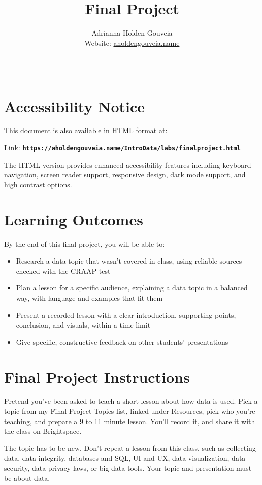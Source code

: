 \documentclass[12pt]{article}
\title{Final Project}
\author{
        Adrianna Holden-Gouveia \\
        Website: \href{https://aholdengouveia.name}{aholdengouveia.name}\\ 
        \date{\vspace{-5ex}}
        \faGithub {: aholdengouveia} \\
        }
\begin{document}
\maketitle

\section*{Accessibility Notice}
This document is also available in HTML format at:

Link: \href{https://aholdengouveia.name/IntroData/labs/finalproject.html}{\textbf{\nolinkurl{https://aholdengouveia.name/IntroData/labs/finalproject.html}}}

The HTML version provides enhanced accessibility features including keyboard navigation, screen reader support, responsive design, dark mode support, and high contrast options.

\section*{Learning Outcomes}
By the end of this final project, you will be able to:
\begin{itemize}
    \item Research a data topic that wasn't covered in class, using reliable sources checked with the CRAAP test
    \item Plan a lesson for a specific audience, explaining a data topic in a balanced way, with language and examples that fit them
    \item Present a recorded lesson with a clear introduction, supporting points, conclusion, and visuals, within a time limit
    \item Give specific, constructive feedback on other students' presentations
\end{itemize}

\section*{Final Project Instructions}
Pretend you've been asked to teach a short lesson about how data is used. Pick a topic from my Final Project Topics list, linked under Resources, pick who you're teaching, and prepare a 9 to 11 minute lesson. You'll record it, and share it with the class on Brightspace.

The topic has to be new. Don't repeat a lesson from this class, such as collecting data, data integrity, databases and SQL, UI and UX, data visualization, data security, data privacy laws, or big data tools. Your topic and presentation must be about data.
\end{document}
